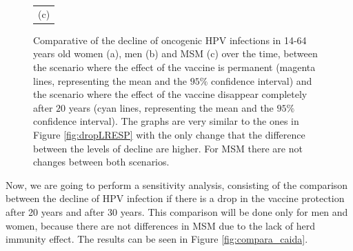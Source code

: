 \begin{figure}[!]
\begin{tabular}{cc}
		\multicolumn{2}{c}{(c)} \\ 
	\end{tabular} 
	\caption{Comparative of the decline of oncogenic HPV infections in 14-64 years old women (a), men (b) and MSM (c) over the time, between the scenario where the effect of the vaccine is permanent (magenta lines, representing  the mean and the $95\%$ confidence interval) and the scenario where the effect of the vaccine disappear completely after $20$ years (cyan lines, representing  the mean and the $95\%$ confidence interval). The graphs are very similar to the ones in Figure \ref{fig:dropLRESP} with the only change that the difference between the levels of decline are higher. For MSM there are not changes between both scenarios.}
	\label{fig:dropHRESP}
\end{figure}

Now, we are going to perform a sensitivity analysis, consisting of the comparison between the decline of HPV infection if there is a drop in the vaccine protection after 20 years and after 30 years. This comparison will be done only for men and women, because there are not differences in MSM due to the lack of herd immunity effect. The results can be seen in Figure \ref{fig:compara_caida}.

